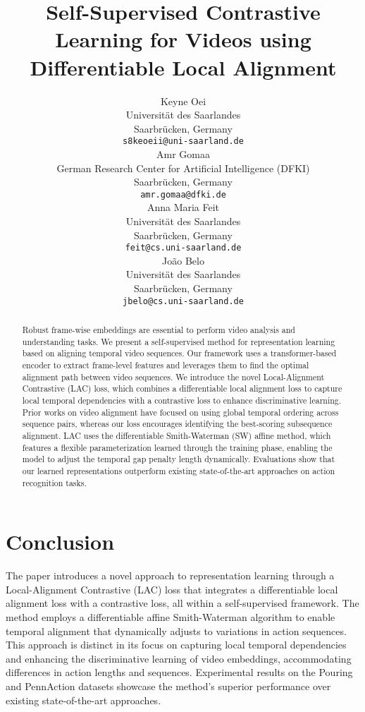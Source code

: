 \documentclass{article}
\title{Self-Supervised Contrastive Learning for Videos using Differentiable Local Alignment}
\author{
 Keyne Oei \\
  Universität des Saarlandes\\
  Saarbrücken, Germany \\
  \texttt{s8keoeii@uni-saarland.de} \\
   \And
 Amr Gomaa \\
  German Research Center for Artificial Intelligence (DFKI)\\
  Saarbrücken, Germany\\
  \texttt{amr.gomaa@dfki.de} \\
  \And
 Anna Maria Feit \\
  Universität des Saarlandes\\
  Saarbrücken, Germany \\
  \texttt{feit@cs.uni-saarland.de} \\
  \And
 João Belo \\
  Universität des Saarlandes\\
  Saarbrücken, Germany \\
  \texttt{jbelo@cs.uni-saarland.de} \\
}
\begin{document}
\maketitle
\begin{abstract}
    Robust frame-wise embeddings are essential to perform video analysis and understanding tasks. We present a self-supervised method for representation learning based on aligning temporal video sequences. Our framework uses a transformer-based encoder to extract frame-level features and leverages them to find the optimal alignment path between video sequences. We introduce the novel Local-Alignment Contrastive (LAC) loss, which combines a differentiable local alignment loss to capture local temporal dependencies with a contrastive loss to enhance discriminative learning. Prior works on video alignment have focused on using global temporal ordering across sequence pairs, whereas our loss encourages  identifying the best-scoring subsequence alignment. LAC uses the differentiable Smith-Waterman (SW) affine method, which features a flexible parameterization learned through the training phase, enabling the model to adjust the temporal gap penalty length dynamically. Evaluations show that our learned representations outperform existing state-of-the-art approaches on action recognition tasks.
\end{abstract}








\section{Conclusion}
The paper introduces a novel approach to representation learning through a Local-Alignment Contrastive (LAC) loss that integrates a differentiable local alignment loss with a contrastive loss, all within a self-supervised framework. 
The method employs a differentiable affine Smith-Waterman algorithm to enable temporal alignment that dynamically adjusts to variations in action sequences. 
This approach is distinct in its focus on capturing local temporal dependencies and enhancing the discriminative learning of video embeddings, accommodating differences in action lengths and sequences.
Experimental results on the Pouring and PennAction datasets showcase the method's superior performance over existing state-of-the-art approaches.
\end{document}
